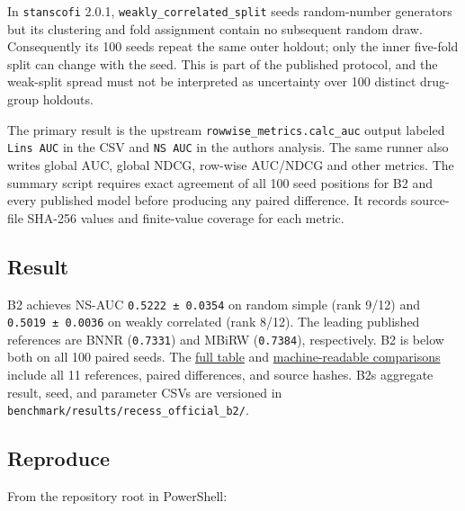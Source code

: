 \documentclass[
  10pt,
]{ctexart}
\begin{document}
In \texttt{stanscofi} 2.0.1, \texttt{weakly\_\allowbreak{}correlated\_\allowbreak{}split} seeds
random-number generators but its clustering and fold assignment contain
no subsequent random draw. Consequently its 100 seeds repeat the same
outer holdout; only the inner five-fold split can change with the seed.
This is part of the published protocol, and the weak-split spread must
not be interpreted as uncertainty over 100 distinct drug-group holdouts.

The primary result is the upstream \texttt{rowwise\_\allowbreak{}metrics.\allowbreak{}calc\_\allowbreak{}auc}
output labeled \texttt{Lin\textquotesingle{}s\ AUC} in the CSV and
\texttt{NS\ AUC} in the authors\textquotesingle{} analysis. The same
runner also writes global AUC, global NDCG, row-wise AUC/NDCG and other
metrics. The summary script requires exact agreement of all 100 seed
positions for B2 and every published model before producing any paired
difference. It records source-file SHA-256 values and finite-value
coverage for each metric.

\subsection{Result}\label{result}

B2 achieves NS-AUC \texttt{0.\allowbreak{}5222\ ±\ 0.\allowbreak{}0354} on random simple (rank
9/12) and \texttt{0.\allowbreak{}5019\ ±\ 0.\allowbreak{}0036} on weakly correlated (rank 8/12).
The leading published references are BNNR (\texttt{0.\allowbreak{}7331}) and MBiRW
(\texttt{0.\allowbreak{}7384}), respectively. B2 is below both on all 100 paired
seeds. The \href{benchmark_results.md}{full table} and
\href{../benchmark/results/recess_official_b2_vs_11.json}{machine-readable
comparisons} include all 11 references, paired differences, and source
hashes. B2\textquotesingle s aggregate result, seed, and parameter CSVs
are versioned in \texttt{benchmark/\allowbreak{}results/\allowbreak{}recess\_\allowbreak{}official\_\allowbreak{}b2/\allowbreak{}}.

\subsection{Reproduce}\label{reproduce}

From the repository root in PowerShell:
\end{document}
